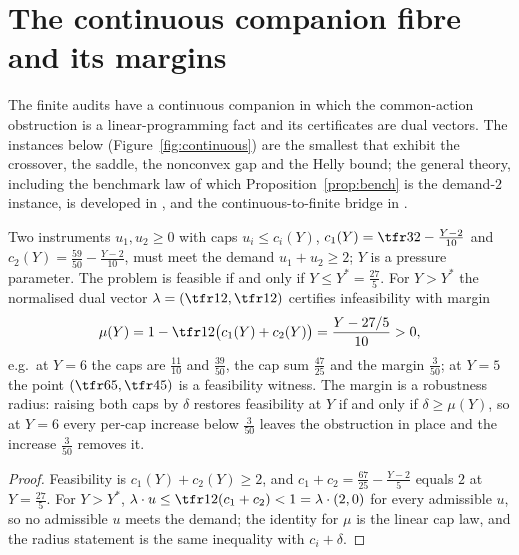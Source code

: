 \section{The continuous companion fibre and its margins}\label{sec:continuous}

The finite audits have a continuous companion in which the common-action obstruction is a linear-programming fact and its certificates are dual vectors. The instances below (Figure~\ref{fig:continuous}) are the smallest that exhibit the crossover, the saddle, the nonconvex gap and the Helly bound; the general theory, including the benchmark law of which Proposition~\ref{prop:bench} is the demand-$2$ instance, is developed in \cite{Abaee2026minimax}, and the continuous-to-finite bridge in \cite{Abaee2026cert}.

\begin{proposition}\label{prop:bench}
Two instruments $u_1,u_2\ge 0$ with caps $u_i\le c_i(Y)$, $c_1(Y)=\tfr32-\tfrac{Y-2}{10}$ and $c_2(Y)=\tfrac{59}{50}-\tfrac{Y-2}{10}$, must meet the demand $u_1+u_2\ge 2$; $Y$ is a pressure parameter. The problem is feasible if and only if $Y\le Y^{\ast}=\tfrac{27}{5}$. For $Y>Y^{\ast}$ the normalised dual vector $\lambda=(\tfr12,\tfr12)$ certifies infeasibility with margin
\[
\mu(Y)=1-\tfr12\bigl(c_1(Y)+c_2(Y)\bigr)=\frac{Y-27/5}{10}>0,
\]
e.g.\ at $Y=6$ the caps are $\tfrac{11}{10}$ and $\tfrac{39}{50}$, the cap sum $\tfrac{47}{25}$ and the margin $\tfrac{3}{50}$; at $Y=5$ the point $(\tfr65,\tfr45)$ is a feasibility witness. The margin is a robustness radius: raising both caps by $\delta$ restores feasibility at $Y$ if and only if $\delta\ge\mu(Y)$, so at $Y=6$ every per-cap increase below $\tfrac{3}{50}$ leaves the obstruction in place and the increase $\tfrac{3}{50}$ removes it.
\end{proposition}

\begin{proof}
Feasibility is $c_1(Y)+c_2(Y)\ge 2$, and $c_1+c_2=\tfrac{67}{25}-\tfrac{Y-2}{5}$ equals $2$ at $Y=\tfrac{27}{5}$. For $Y>Y^{\ast}$, $\lambda\cdot u\le\tfr12(c_1+c_2)<1=\lambda\cdot(2,0)$ for every admissible $u$, so no admissible $u$ meets the demand; the identity for $\mu$ is the linear cap law, and the radius statement is the same inequality with $c_i+\delta$.
\end{proof}

